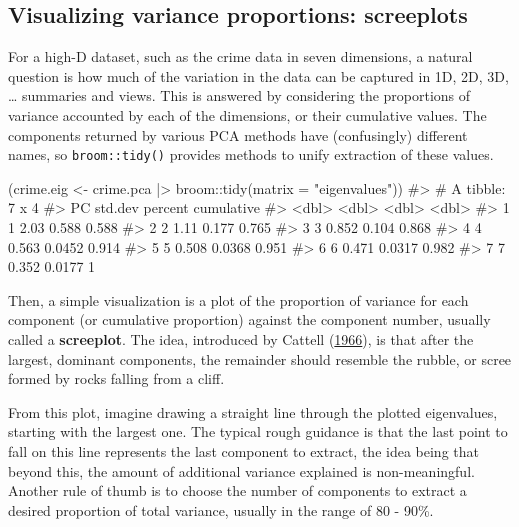 \documentclass[
  letterpaper,
  10pt,
  krantz2]{krantz}
\makeatletter
\newenvironment{Shaded}{\begin{snugshade}}{\end{snugshade}}
\newcommand{\AttributeTok}[1]{\textcolor[rgb]{0.40,0.45,0.13}{#1}}
\newcommand{\CommentTok}[1]{\textcolor[rgb]{0.37,0.37,0.37}{#1}}
\newcommand{\FunctionTok}[1]{\textcolor[rgb]{0.28,0.35,0.67}{#1}}
\newcommand{\NormalTok}[1]{\textcolor[rgb]{0.00,0.23,0.31}{#1}}
\newcommand{\OtherTok}[1]{\textcolor[rgb]{0.00,0.23,0.31}{#1}}
\newcommand{\SpecialCharTok}[1]{\textcolor[rgb]{0.37,0.37,0.37}{#1}}
\newcommand{\StringTok}[1]{\textcolor[rgb]{0.13,0.47,0.30}{#1}}
\newenvironment{kframe}{%
  \medskip{}
  \setlength{\fboxsep}{.8em}
  \def\at@end@of@kframe{}%
  \ifinner\ifhmode%
  \def\at@end@of@kframe{\end{minipage}}%
  \begin{minipage}{\columnwidth}%
  \fi\fi%
  \def\FrameCommand##1{\hskip\@totalleftmargin \hskip-\fboxsep
  \colorbox{shadecolor}{##1}\hskip-\fboxsep
      \hskip-\linewidth \hskip-\@totalleftmargin \hskip\columnwidth}%
  \MakeFramed {\advance\hsize-\width
    \@totalleftmargin\z@ \linewidth\hsize
    \@setminipage}}%
{\par\unskip\endMakeFramed%
  \at@end@of@kframe}
\renewenvironment{Shaded}{\begin{kframe}}{\end{kframe}}
\makeatother
\begin{document}
\hypertarget{visualizing-variance-proportions-screeplots}{%
\subsection{Visualizing variance proportions:
screeplots}\label{visualizing-variance-proportions-screeplots}}

For a high-D dataset, such as the crime data in seven dimensions, a
natural question is how much of the variation in the data can be
captured in 1D, 2D, 3D, \ldots{} summaries and views. This is answered
by considering the proportions of variance accounted by each of the
dimensions, or their cumulative values. The components returned by
various PCA methods have (confusingly) different names, so
\texttt{broom::tidy()} provides methods to unify extraction of these
values.

\begin{Shaded}
\begin{Highlighting}[]
\NormalTok{(crime.eig }\OtherTok{\textless{}{-}}\NormalTok{ crime.pca }\SpecialCharTok{|\textgreater{}} 
\NormalTok{  broom}\SpecialCharTok{::}\FunctionTok{tidy}\NormalTok{(}\AttributeTok{matrix =} \StringTok{"eigenvalues"}\NormalTok{))}
\CommentTok{\#\textgreater{} \# A tibble: 7 x 4}
\CommentTok{\#\textgreater{}      PC std.dev percent cumulative}
\CommentTok{\#\textgreater{}   \textless{}dbl\textgreater{}   \textless{}dbl\textgreater{}   \textless{}dbl\textgreater{}      \textless{}dbl\textgreater{}}
\CommentTok{\#\textgreater{} 1     1   2.03   0.588       0.588}
\CommentTok{\#\textgreater{} 2     2   1.11   0.177       0.765}
\CommentTok{\#\textgreater{} 3     3   0.852  0.104       0.868}
\CommentTok{\#\textgreater{} 4     4   0.563  0.0452      0.914}
\CommentTok{\#\textgreater{} 5     5   0.508  0.0368      0.951}
\CommentTok{\#\textgreater{} 6     6   0.471  0.0317      0.982}
\CommentTok{\#\textgreater{} 7     7   0.352  0.0177      1}
\end{Highlighting}
\end{Shaded}

Then, a simple visualization is a plot of the proportion of variance for
each component (or cumulative proportion) against the component number,
usually called a \textbf{screeplot}. The idea, introduced by Cattell
(\protect\hyperlink{ref-Cattell1966}{1966}), is that after the largest,
dominant components, the remainder should resemble the rubble, or scree
formed by rocks falling from a cliff.

From this plot, imagine drawing a straight line through the plotted
eigenvalues, starting with the largest one. The typical rough guidance
is that the last point to fall on this line represents the last
component to extract, the idea being that beyond this, the amount of
additional variance explained is non-meaningful. Another rule of thumb
is to choose the number of components to extract a desired proportion of
total variance, usually in the range of 80 - 90\%.
\end{document}
